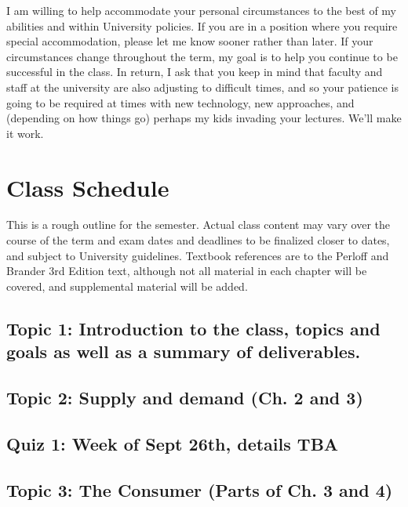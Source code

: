 \documentclass[11pt,]{article}
\begin{document}
I am willing to help accommodate your personal circumstances to the best
of my abilities and within University policies. If you are in a position
where you require special accommodation, please let me know sooner
rather than later. If your circumstances change throughout the term, my
goal is to help you continue to be successful in the class. In return, I
ask that you keep in mind that faculty and staff at the university are
also adjusting to difficult times, and so your patience is going to be
required at times with new technology, new approaches, and (depending on
how things go) perhaps my kids invading your lectures. We'll make it
work.

\hypertarget{class-schedule}{%
\section{Class Schedule}\label{class-schedule}}

This is a rough outline for the semester. Actual class content may vary
over the course of the term and exam dates and deadlines to be finalized
closer to dates, and subject to University guidelines. Textbook
references are to the Perloff and Brander 3rd Edition text, although not
all material in each chapter will be covered, and supplemental material
will be added.

\hypertarget{topic-1-introduction-to-the-class-topics-and-goals-as-well-as-a-summary-of-deliverables.}{%
\subsection{Topic 1: Introduction to the class, topics and goals as well
as a summary of
deliverables.}\label{topic-1-introduction-to-the-class-topics-and-goals-as-well-as-a-summary-of-deliverables.}}

\hypertarget{topic-2-supply-and-demand-ch.-2-and-3}{%
\subsection{Topic 2: Supply and demand (Ch. 2 and
3)}\label{topic-2-supply-and-demand-ch.-2-and-3}}

\hypertarget{quiz-1-week-of-sept-26th-details-tba}{%
\subsection{Quiz 1: Week of Sept 26th, details
TBA}\label{quiz-1-week-of-sept-26th-details-tba}}

\hypertarget{topic-3-the-consumer-parts-of-ch.-3-and-4}{%
\subsection{Topic 3: The Consumer (Parts of Ch. 3 and
4)}\label{topic-3-the-consumer-parts-of-ch.-3-and-4}}
\end{document}
